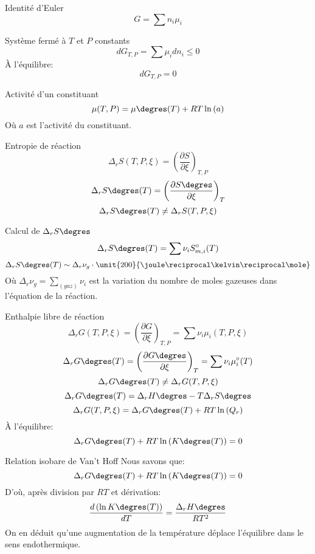 \documentclass[french, a4paper, 11pt, twocolumn]{article}
\newcommand{\po}{\left(}         %
\newcommand{\pf}{\right)}        %
\newcommand{\pof}[1]{\po #1 \pf} %
\newcommand{\drz}[1]{\Delta_r#1\degres}
\begin{document}
\begin{cadre}{Identité d'Euler}
  \[G = \sum n_{i}\mu_{i}\]
\end{cadre}

\begin{cadre}{Système fermé à $T$ et $P$ constants}
  \[dG_{T,P} = \sum \mu_{i}dn_{i} \leq 0\]
  À l'équilibre:
  \[dG_{T,P} = 0\]
\end{cadre}

\begin{cadre}{Activité d'un constituant}
  \[\mu(T,P) = \mu\degres(T) + RT\ln\pof{a}\]
  Où $a$ est l'activité du constituant.
\end{cadre}

\begin{cadre}{Entropie de réaction}
  \[\Delta_{r}S(T, P, \xi) = \pof{\dfrac{\partial S}{\partial \xi}}_{T,P}\]
  \[\drz{S}(T) = \pof{\dfrac{\partial S\degres}{\partial \xi}}_{T}\]
  \[\drz{S}(T) \neq \Delta_{r}S(T,P,\xi)\]
\end{cadre}

\begin{cadre}{Calcul de $\drz{S}$}
  \[\drz{S}(T) = \sum \nu_{i}S_{m,i}^{\circ}(T)\]
  \[\drz{S}(T) \sim \Delta_{r}\nu_{g}\cdot \unit{200}{\joule\reciprocal\kelvin\reciprocal\mole}\]
  Où $\Delta_{r}\nu_{g}=\sum_{(gaz)}\nu_{i}$ est la variation du nombre de moles gazeuses dans l'équation de la réaction.
\end{cadre}

\begin{cadre}{Enthalpie libre de réaction}
  \[\Delta_{r}G(T, P, \xi) = \pof{\dfrac{\partial G}{\partial \xi}}_{T,P} = \sum \nu_{i}\mu_{i}(T,P,\xi)\]
  \[\drz{G}(T) = \pof{\dfrac{\partial G\degres}{\partial \xi}}_{T} = \sum \nu_{i}\mu_{i}^{\circ}(T)\]
  \[\drz{G}(T) \neq \Delta_{r}G(T,P,\xi)\]
  \[\drz{G}(T) = \drz{H} - T\drz{S}\]
  \[\Delta_{r}G(T, P, \xi) = \drz{G}(T) + RT\ln\pof{Q_{r}}\]
  À l'équilibre:
  \[\drz{G}(T) + RT\ln\pof{K\degres(T)} = 0\]
\end{cadre}

\begin{cadre}{Relation isobare de Van't Hoff}
  Nous savons que:
  \[\drz{G}(T) + RT\ln\pof{K\degres(T)} = 0\]
  D'où, après division par $RT$ et dérivation:
  \[\dfrac{d\pof{\ln K\degres(T)}}{dT} = \dfrac{\drz{H}}{RT^{2}}\]
  On en déduit qu'une augmentation de la température déplace l'équilibre dans le sens endothermique.
\end{cadre}
\end{document}
